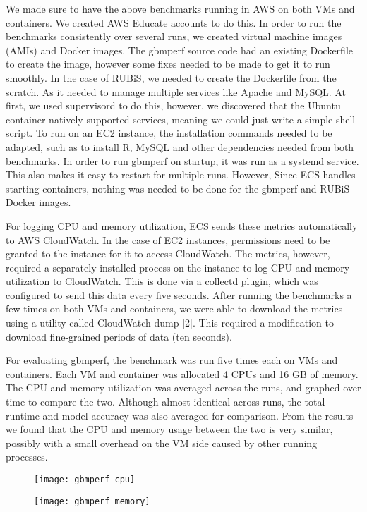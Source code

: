 \documentclass[11pt]{article}
\begin{document}
We made sure to have the above benchmarks running in AWS on both VMs and containers. We created AWS Educate accounts to do this. In order to run the benchmarks consistently over several runs, we created virtual machine images (AMIs) and Docker images. The gbmperf source code had an existing Dockerfile to create the image, however some fixes needed to be made to get it to run smoothly. In the case of RUBiS, we needed to create the Dockerfile from the scratch. As it needed to manage multiple services like Apache and MySQL. At first, we used supervisord to do this, however, we discovered that the Ubuntu container natively supported services, meaning we could just write a simple shell script. To run on an EC2 instance, the installation commands needed to be adapted, such as to install R, MySQL and other dependencies needed from both benchmarks. In order to run gbmperf on startup, it was run as a systemd service. This also makes it easy to restart for multiple runs. However, Since ECS handles starting containers, nothing was needed to be done for the gbmperf and RUBiS Docker images.

For logging CPU and memory utilization, ECS sends these metrics automatically to AWS CloudWatch. In the case of EC2 instances, permissions need to be granted to the instance for it to access CloudWatch. The metrics, however, required a separately installed process on the instance to log CPU and memory utilization to CloudWatch. This is done via a collectd plugin, which was configured to send this data every five seconds. After running the benchmarks a few times on both VMs and containers, we were able to download the metrics using a utility called CloudWatch-dump [2]. This required a modification to download fine-grained periods of data (ten seconds).

For evaluating gbmperf, the benchmark was run five times each on VMs and containers. Each VM and container was allocated 4 CPUs and 16 GB of memory. The CPU and memory utilization was averaged across the runs, and graphed over time to compare the two. Although almost identical across runs, the total runtime and model accuracy was also averaged for comparison. From the results we found that the CPU and memory usage between the two is very similar, possibly with a small overhead on the VM side caused by other running processes.

\begin{figure}
\centering
\begin{minipage}{.5\textwidth}
  \centering
  \texttt{[image: gbmperf\_cpu]}
  \label{CPU}
\end{minipage}%
\begin{minipage}{.5\textwidth}
  \centering
  \texttt{[image: gbmperf\_memory]}
  \label{Memory}
\end{minipage}
\end{figure}
\end{document}
